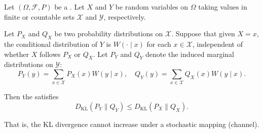 \begin{theorem} \label{theorem:data_processing_inequality_for_relative_entropy}
Let $(\Omega, \mathcal{F}, P)$ be a . Let $X$ and $Y$ be random variables on $\Omega$ taking values in finite or countable sets $\mathcal{X}$ and $\mathcal{Y}$, respectively.

Let $P_X$ and $Q_X$ be two probability distributions on $\mathcal{X}$. Suppose that given $X = x$, the conditional distribution of $Y$ is $W(\cdot \mid x)$ for each $x \in \mathcal{X}$, independent of whether $X$ follows $P_X$ or $Q_X$. Let $P_Y$ and $Q_Y$ denote the induced marginal distributions on $\mathcal{Y}$:
$$P_Y(y) = \sum_{x \in \mathcal{X}} P_X(x) W(y \mid x), \quad Q_Y(y) = \sum_{x \in \mathcal{X}} Q_X(x) W(y \mid x).$$

Then the  satisfies
$$D_{\mathrm{KL}}(P_Y \| Q_Y) \leq D_{\mathrm{KL}}(P_X \| Q_X).$$

That is, the KL divergence cannot increase under a stochastic mapping (channel).
\end{theorem}
